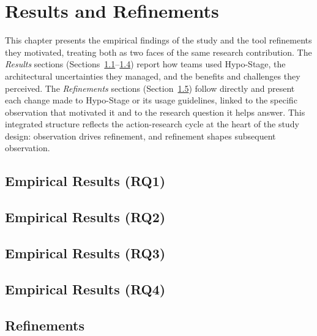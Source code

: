 
\chapter{Results and Refinements}
\label{chap:results}
\label{ch:results}

This chapter presents the empirical findings of the study and the tool refinements
they motivated, treating both as two faces of the same research contribution. The
\emph{Results} sections (Sections~\ref{sec:results-rq1}--\ref{sec:results-rq4}) report
how teams used Hypo-Stage, the architectural uncertainties they managed, and the
benefits and challenges they perceived. The \emph{Refinements} sections
(Section~\ref{sec:refinements}) follow directly and present each change made to
Hypo-Stage or its usage guidelines, linked to the specific observation that motivated it
and to the research question it helps answer. This integrated structure reflects the
action-research cycle at the heart of the study design: observation drives refinement,
and refinement shapes subsequent observation.

\section{Empirical Results (RQ1)}
\label{sec:results-rq1}


\section{Empirical Results (RQ2)}
\label{sec:results-rq2}


\section{Empirical Results (RQ3)}
\label{sec:results-rq3}


\section{Empirical Results (RQ4)}
\label{sec:results-rq4}


\section{Refinements}
\label{sec:refinements}


